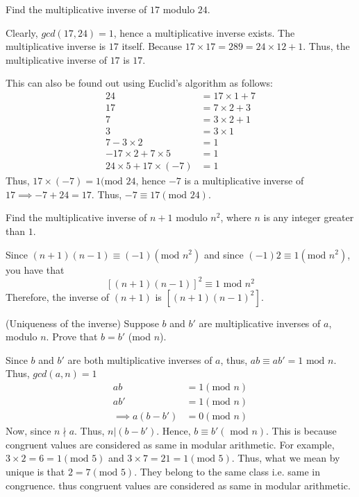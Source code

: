 \begin{example}
Find the multiplicative inverse of $17$ modulo $24$. 

Clearly, $gcd(17,24)=1$, hence a multiplicative inverse exists. The multiplicative inverse is $17$ itself. Because $17\times 17 = 289 = 24\times 12 + 1$. Thus, the multiplicative inverse of $17$ is $17$.

This can also be found out using Euclid's algorithm as follows:
\begin{align*}
    24 &=17 \times 1 +7\\
    17 &= 7 \times 2 + 3\\
    7 &= 3\times 2 + 1\\
    3 &= 3 \times 1\\
    7 - 3 \times 2 &=1\\
    - 17 \times 2 + 7 \times 5 &=1\\
    24 \times 5 +17 \times (-7)&=1
\end{align*}
Thus, $17 \times (-7) = 1 (\text{mod }24$, hence $-7$ is a multiplicative inverse of $17 \implies -7 + 24 = 17$. Thus, $-7 \equiv 17 (\text{mod }24)$.
\end{example}

\begin{example}
    Find the multiplicative inverse of $n+1$ modulo $n^2$, where $n$ is any integer greater than $1$.
    
Since $(n+1)(n-1)\equiv(-1)(\text{mod } n^2)$ and since $(-1)2\equiv1(\text{mod } n^2)$, you have that
\[
[(n+1)(n-1)]^2 \equiv 1 \text{ mod }n^2
\]
Therefore, the inverse of $(n+1)$ is $[(n+1)(n-1)^2]$.
\end{example}

\begin{example}
    (Uniqueness of the inverse) Suppose $b$ and $b'$ are multiplicative inverses of $a$, modulo $n$. Prove that $b=b'$ (mod $n$).

    Since $b$ and $b'$ are both multiplicative inverses of $a$, thus, $ab\equiv ab' = 1 \text{ mod }n$. Thus, $gcd(a,n)=1$
    \begin{align*}
        ab&=1 (\text{mod }n)\\
        ab' &=1(\text{mod }n)\\
        \implies a(b-b')&=0(\text{mod }n)
    \end{align*}
    Now, since $n \nmid a$. Thus, $n|(b-b')$. Hence, $b\equiv b' (\text{ mod }n)$. This is because congruent values are considered as same in modular arithmetic. For example, $3\times 2=6 =1 (\text{mod } 5)$ and $3\times 7=21=1 (\text{mod }5)$. Thus, what we mean by unique is that $2=7 (\text{mod }5)$. They belong to the same class i.e. same in congruence. thus congruent values are considered as same in modular arithmetic.
\end{example}

